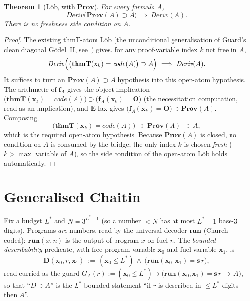 \documentclass[11pt]{article}
\theoremstyle{plain}
\newtheorem{theorem}{Theorem}[section]
\theoremstyle{definition}
\theoremstyle{remark}
\newcommand{\code}[1]{\mathit{code}(#1)}
\newcommand{\thmT}{\mathbf{thmT}}
\newcommand{\runp}{\mathbf{run}}
\newcommand{\Ee}{\mathbf{E}}
\newcommand{\Prov}{\mathbf{Prov}}
\newcommand{\Deriv}{\mathit{Deriv}}
\newcommand{\Lstar}{L^{*}}
\newcommand{\describe}{\mathbf{D}}
\begin{document}
\begin{theorem}[L\"ob, with $\Prov$]\label{thm:lob}
For every formula $A$,
\[
  \Deriv\bigl(\Prov(A)\supset A\bigr)\ \Longrightarrow\ \Deriv(A).
\]
There is \emph{no} freshness side condition on $A$.
\end{theorem}
\begin{proof}
The existing thmT-atom L\"ob (the unconditional generalisation of Guard's clean
diagonal G\"odel~II, see~\cite{arGII}) gives, for any proof-variable index $k$
not free in $A$,
\[
  \Deriv\Bigl(\bigl(\thmT(\mathbf{x}_k)=\code{A}\bigr)\supset A\Bigr)
  \ \Longrightarrow\ \Deriv(A).
\]
It suffices to turn an $\Prov(A)\supset A$ hypothesis into this open-atom
hypothesis. The arithmetic of $\mathbf{f}_A$ gives the object implication
$\bigl(\thmT(\mathbf{x}_k)=\code{A}\bigr)\supset\bigl(\mathbf{f}_A(\mathbf{x}_k)=\mathbf{O}\bigr)$
(the necessitation computation, read as an implication), and $\Ee$-Iax gives
$\bigl(\mathbf{f}_A(\mathbf{x}_k)=\mathbf{O}\bigr)\supset\Prov(A)$. Composing,
\[
  \bigl(\thmT(\mathbf{x}_k)=\code{A}\bigr)\ \supset\ \Prov(A)\ \supset\ A,
\]
which is the required open-atom hypothesis. Because $\Prov(A)$ is closed, no
condition on $A$ is consumed by the bridge; the only index $k$ is chosen
\emph{fresh} ($k>\max$ variable of $A$), so the side condition of the open-atom
L\"ob holds automatically.
\end{proof}

\section{Generalised Chaitin}

Fix a budget $\Lstar$ and $N=3^{\Lstar+1}$ (so a number $<N$ has at most
$\Lstar+1$ base-$3$ digits). Programs \emph{are} numbers, read by the universal
decoder $\runp$ (Church-coded): $\runp(x,n)$ is the output of program $x$ on
fuel $n$. The \emph{bounded describability} predicate, with free program
variable $\mathbf{x}_0$ and fuel variable $\mathbf{x}_1$, is
\[
  \describe(\mathbf{x}_0,r,\mathbf{x}_1)\ :=\
   (\mathbf{x}_0\le\Lstar)\ \wedge\ \bigl(\runp(\mathbf{x}_0,\mathbf{x}_1)=\mathbf{s}\,r\bigr),
\]
read curried as the guard $G_A(r):=(\mathbf{x}_0\le\Lstar)\supset\bigl(\runp(\mathbf{x}_0,\mathbf{x}_1)=\mathbf{s}\,r\ \supset\ A\bigr)$,
so that ``$D\supset A$'' is the $\Lstar$-bounded statement ``if $r$ is described
in $\le\Lstar$ digits then $A$''.
\end{document}
